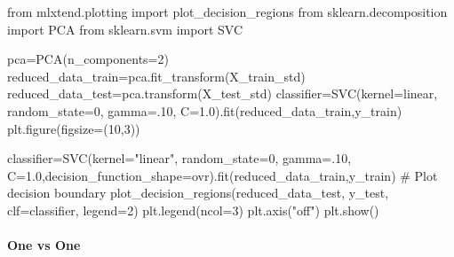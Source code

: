 \documentclass[
  letterpaper,
  DIV=11,
  numbers=noendperiod]{scrartcl}
\let\oldparagraph\paragraph
\renewcommand{\paragraph}[1]{\oldparagraph{#1}\mbox{}}
\newenvironment{Shaded}{\begin{snugshade}}{\end{snugshade}}
\newcommand{\CommentTok}[1]{\textcolor[rgb]{0.37,0.37,0.37}{#1}}
\newcommand{\DecValTok}[1]{\textcolor[rgb]{0.68,0.00,0.00}{#1}}
\newcommand{\FloatTok}[1]{\textcolor[rgb]{0.68,0.00,0.00}{#1}}
\newcommand{\ImportTok}[1]{\textcolor[rgb]{0.00,0.46,0.62}{#1}}
\newcommand{\NormalTok}[1]{\textcolor[rgb]{0.00,0.23,0.31}{#1}}
\newcommand{\OperatorTok}[1]{\textcolor[rgb]{0.37,0.37,0.37}{#1}}
\newcommand{\StringTok}[1]{\textcolor[rgb]{0.13,0.47,0.30}{#1}}
\begin{document}
\begin{Shaded}
\begin{Highlighting}[]
\ImportTok{from}\NormalTok{ mlxtend.plotting }\ImportTok{import}\NormalTok{ plot\_decision\_regions}
\ImportTok{from}\NormalTok{ sklearn.decomposition }\ImportTok{import}\NormalTok{ PCA}
\ImportTok{from}\NormalTok{ sklearn.svm }\ImportTok{import}\NormalTok{ SVC}

\NormalTok{pca}\OperatorTok{=}\NormalTok{PCA(n\_components}\OperatorTok{=}\DecValTok{2}\NormalTok{)}
\NormalTok{reduced\_data\_train}\OperatorTok{=}\NormalTok{pca.fit\_transform(X\_train\_std)}
\NormalTok{reduced\_data\_test}\OperatorTok{=}\NormalTok{pca.transform(X\_test\_std)}
\NormalTok{classifier}\OperatorTok{=}\NormalTok{SVC(kernel}\OperatorTok{=}\StringTok{\textquotesingle{}linear\textquotesingle{}}\NormalTok{, random\_state}\OperatorTok{=}\DecValTok{0}\NormalTok{, gamma}\OperatorTok{=}\FloatTok{.10}\NormalTok{, C}\OperatorTok{=}\FloatTok{1.0}\NormalTok{).fit(reduced\_data\_train,y\_train)}
\NormalTok{plt.figure(figsize}\OperatorTok{=}\NormalTok{(}\DecValTok{10}\NormalTok{,}\DecValTok{3}\NormalTok{))}

\NormalTok{classifier}\OperatorTok{=}\NormalTok{SVC(kernel}\OperatorTok{=}\StringTok{"linear"}\NormalTok{, random\_state}\OperatorTok{=}\DecValTok{0}\NormalTok{, gamma}\OperatorTok{=}\FloatTok{.10}\NormalTok{, C}\OperatorTok{=}\FloatTok{1.0}\NormalTok{,decision\_function\_shape}\OperatorTok{=}\StringTok{\textquotesingle{}ovr\textquotesingle{}}\NormalTok{).fit(reduced\_data\_train,y\_train)}
\CommentTok{\# Plot decision boundary}
\NormalTok{plot\_decision\_regions(reduced\_data\_test, y\_test, clf}\OperatorTok{=}\NormalTok{classifier, legend}\OperatorTok{=}\DecValTok{2}\NormalTok{)}
\NormalTok{plt.legend(ncol}\OperatorTok{=}\DecValTok{3}\NormalTok{)}
\NormalTok{plt.axis(}\StringTok{"off"}\NormalTok{)}
\NormalTok{plt.show()}
\end{Highlighting}
\end{Shaded}

\paragraph{One vs One}\label{one-vs-one-1}
\end{document}
